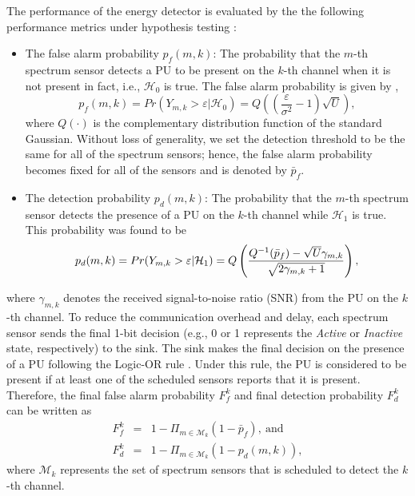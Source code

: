 \documentclass[journal]{IEEEtran} \ifCLASSINFOpdf
\begin{document}
The performance of the energy detector is evaluated by the the following performance metrics under hypothesis testing \cite{Atapattu:2014:}:
\begin{itemize}
\item The false alarm probability $p_f (m,k)$: The probability that the $m$-th spectrum sensor detects a PU to be present on the $k$-th channel when it is not present in fact, i.e., $\mathcal{H}_0$ is true. The false alarm probability is given by \cite{Liang2008},
\begin{equation}
\label{pf}
p_f (m,k) = Pr(Y_{m,k} > \varepsilon | \mathcal{H}_0) = Q\left( \left(\frac{\varepsilon}{\sigma^2} - 1 \right) \sqrt{U} \right),
\end{equation}
where $Q(\cdot)$ is the complementary distribution function of the standard Gaussian. Without loss of generality, we set the detection threshold to be the same for all of the spectrum sensors; hence, the false alarm probability becomes fixed for all of the sensors and is denoted by $\bar{p}_f$.
\item  The detection probability $p_d (m,k)$: The probability that the $m$-th spectrum sensor detects the presence of a PU on the $k$-th channel while $\mathcal{H}_1$ is true. This probability was found to be \cite{Liang2008}
\begin{equation}
\small
\label{eqn_pd}
p_d(m, k) = Pr(Y_{m,k} > \varepsilon | \mathcal{H}_1) =Q\left(\frac{Q^{-1}(\bar{p}_f) - \sqrt{U}\gamma_{m,k}}{\sqrt{2 \gamma_{m,k} + 1}} \right),
\end{equation}
\end{itemize}
where $\gamma_{m,k}$ denotes the received signal-to-noise ratio (SNR) from the PU on the $k$-th channel. To reduce the communication overhead and delay, each spectrum sensor sends the final 1-bit decision (e.g., 0 or 1 represents the \textit{Active} or \textit{Inactive} state, respectively) to the sink. The sink makes the final decision on the presence of a PU following the Logic-OR rule \cite{Liang2008,Deng2012}. Under this rule, the PU is considered to be present if at least one of the scheduled sensors reports that it is present. Therefore, the final false alarm probability $F_f^k$ and final detection probability $F_d^k$ can be written as
\begin{eqnarray}
F_f^k  & = & 1- \Pi_{m \in \mathcal{M}_k} (1 - \bar{p}_f) \label{eqn_ff},~\mbox{and}\\
F_d^k & = & 1- \Pi_{m \in \mathcal{M}_k} (1 - p_d(m, k)) \label{eqn_fd},
\end{eqnarray}
where $\mathcal{M}_k$ represents the set of spectrum sensors that is scheduled to detect the $k$-th channel.
\end{document}
